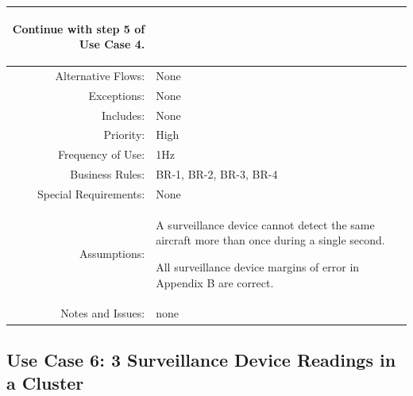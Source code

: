 \documentclass[12pt,oneside,letterpaper]{article}
\newenvironment{packed_enumerate}{ %
\vspace{-7mm}
\begin{enumerate}
  \setlength{\itemsep}{0pt}
  \setlength{\parskip}{0pt}
  \setlength{\parsep}{0pt}
}{\end{enumerate}
\vspace{-8mm}}
\begin{document}
\begin{longtable}{|r|p{3.8in}|}
\begin{packed_enumerate}
\item Continue with step 5 of Use Case 4.
\end{packed_enumerate}\\
\hline
Alternative Flows:&None\\
\hline
Exceptions:&None\\
\hline
Includes:&None\\
\hline
Priority:&High\\
\hline
Frequency of Use:&1Hz\\
\hline
Business Rules:&BR-1, BR-2, BR-3, BR-4\\
\hline
Special Requirements:&None\\
\hline
Assumptions: &
\begin{packed_enumerate}
\item A surveillance device cannot detect the same aircraft more than once during a single second.
\item All surveillance device margins of error in Appendix B are correct.
\end{packed_enumerate}\\
\hline
Notes and Issues:&none\\
\hline
\end{longtable}

\subsection{\label{Corr3}Use Case 6: 3 Surveillance Device Readings in a Cluster}
\end{document}
